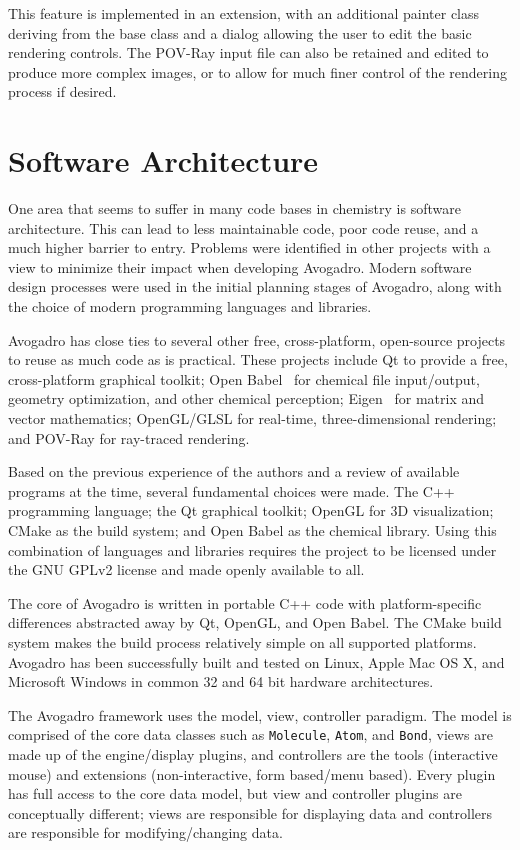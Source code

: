 \documentclass[10pt]{bmc_article}
\newenvironment{bmcformat}{\begin{raggedright}
  \baselineskip20pt\sloppy\setboolean{publ}{false}}{\end{raggedright}
  \baselineskip20pt\sloppy}
\begin{document}
\begin{bmcformat}
This feature is implemented in an extension, with an additional painter class
deriving from the base class and a dialog allowing the user to edit the basic
rendering controls. The POV-Ray input file can also be retained and edited to
produce more complex images, or to allow for much finer control of the
rendering process if desired.

\section*{Software Architecture}

One area that seems to suffer in many code bases in chemistry is software
architecture. This can lead to less maintainable code, poor code reuse, and a
much higher barrier to entry. Problems were identified in other projects with a
view to minimize their impact when developing Avogadro. Modern software design
processes were used in the initial planning stages of Avogadro, along with the
choice of modern programming languages and libraries.

Avogadro has close ties to several other free, cross-platform, open-source
projects to reuse as much code as is practical. These projects include
Qt to provide a free, cross-platform graphical toolkit; Open
Babel~\cite{OpenBabel} for chemical file input/output, geometry optimization, and
other chemical perception; Eigen~\cite{Eigen} for matrix and vector mathematics;
OpenGL/GLSL for real-time, three-dimensional rendering; and POV-Ray for ray-traced
rendering.

Based on the previous experience of the authors and a review of
available programs at the time, several fundamental choices were made.
The C++ programming language; the Qt graphical toolkit;
OpenGL for 3D visualization; CMake as the build system; and Open Babel as
the chemical library. Using this combination of languages and
libraries requires the project to be licensed under the GNU GPLv2
license and made openly available to all.

The core of Avogadro is written in portable C++ code with platform-specific
differences abstracted away by Qt, OpenGL, and Open Babel. The CMake build system
makes the build process relatively simple on all supported platforms. Avogadro
has been successfully built and tested on Linux, Apple Mac OS X, and Microsoft
Windows in common 32 and 64 bit hardware architectures.

The Avogadro framework uses the model, view, controller paradigm. The model
is comprised of the core data classes such as {\tt Molecule}, {\tt Atom}, and
{\tt Bond}, views are made up of the engine/display plugins, and
controllers are the tools (interactive mouse) and extensions
(non-interactive, form based/menu based). Every plugin has full access
to the core data model, but view and controller plugins are
conceptually different; views are responsible for displaying
data and controllers are responsible for modifying/changing data.


\end{bmcformat}
\end{document}

